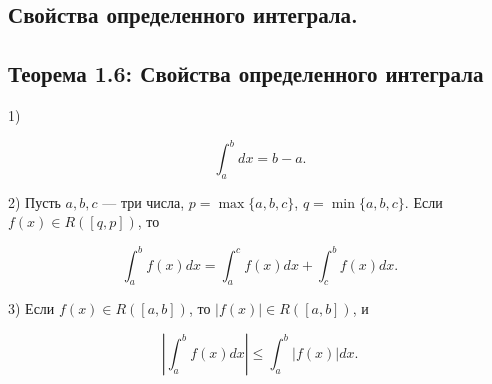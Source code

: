 {
\subsection{Свойства определенного интеграла.}
\subsection*{Теорема 1.6: Свойства определенного интеграла}

1) 


\[
\int_{a}^{b} dx = b - a.
\]



2) Пусть \( a, b, c \) — три числа, \( p = \max\{a, b, c\} \), \( q = \min\{a, b, c\} \).
Если \( f(x) \in R([q, p]) \), то


\[
\int_{a}^{b} f(x)dx = \int_{a}^{c} f(x)dx + \int_{c}^{b} f(x)dx.
\]



3) Если \( f(x) \in R([a, b]) \), то \( |f(x)| \in R([a, b]) \), и


\[
\left| \int_{a}^{b} f(x)dx \right| \leq \int_{a}^{b} |f(x)|dx.
\]



}